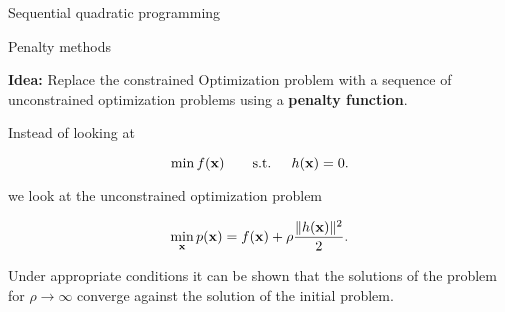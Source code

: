 \begin{vbframe}{Sequential quadratic programming}
%
%
%
%
%
%
%
%
%
%
%
%

\end{vbframe}

\begin{vbframe}{Penalty methods}

\textbf{Idea:} Replace the constrained Optimization problem with a sequence of unconstrained optimization problems using a \textbf{penalty function}.

\lz

Instead of looking at

$$
\min f(\mathbf{x}) \qquad \text{s.t. } \quad h(\mathbf{x}) = 0.
$$

we look at the unconstrained optimization problem

$$
\min_{\mathbf{x}} p(\mathbf{x}) = f(\mathbf{x}) + \rho \frac{\|h(\mathbf{x})\|^2}{2}.
$$

Under appropriate conditions it can be shown that the solutions of the problem for $\rho \to \infty$ converge against the solution of the initial problem.

\end{vbframe}

